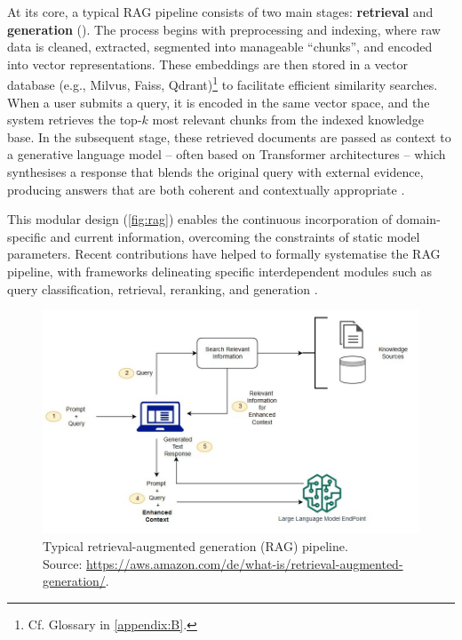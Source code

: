 \begin{spacing}{1.5}
At its core, a typical RAG pipeline consists of two main stages: \textbf{retrieval} and \textbf{generation} (\cite{odsc-community_retrieval-augmented_2024}). The process begins with preprocessing and indexing, where raw data is cleaned, extracted, segmented into manageable ``chunks'', and encoded into vector representations. These embeddings are then stored in a vector database (e.g., Milvus, Faiss, Qdrant)\footnote{Cf. Glossary in \autoref{appendix:B}.} to facilitate efficient similarity searches. When a user submits a query, it is encoded in the same vector space, and the system retrieves the top-$k$ most relevant chunks from the indexed knowledge base. In the subsequent stage, these retrieved documents are passed as context to a generative language model -- often based on Transformer architectures \citep{vaswani_attention_2017} -- which synthesises a response that blends the original query with external evidence, producing answers that are both coherent and contextually appropriate \citep{arslan_survey_2024}.

This modular design (\autoref{fig:rag}) enables the continuous incorporation of domain-specific and current information, overcoming the constraints of static model parameters. Recent contributions have helped to formally systematise the RAG pipeline, with frameworks delineating specific interdependent modules such as query classification, retrieval, reranking, and generation \parencite{wang_searching_2024,gao_retrieval-augmented_2024}.

\begin{figure}[H]
  \centering
  \includegraphics[width=\textwidth]{images/rag_workflow.jpg} 
  \caption{Typical retrieval-augmented generation (RAG) pipeline.\\
  \footnotesize{Source: \url{https://aws.amazon.com/de/what-is/retrieval-augmented-generation/}.\nocite{noauthor_was_nodate}}}
  \label{fig:rag}
\end{figure}


\end{spacing}
